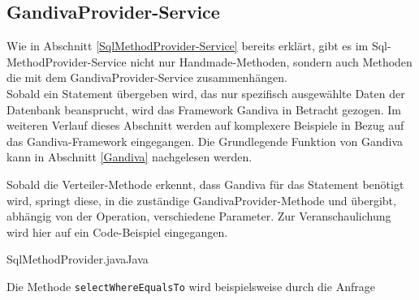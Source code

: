 \subsection{GandivaProvider-Service}
\label{GandivaProvider-Service}

Wie in Abschnitt \ref{SqlMethodProvider-Service} bereits erklärt, gibt es im Sql-MethodProvider-Service nicht nur Handmade-Methoden, sondern auch Methoden die mit dem GandivaProvider-Service zusammenhängen.
\\
Sobald ein Statement übergeben wird, das nur spezifisch ausgewählte Daten der Datenbank beansprucht, wird das Framework Gandiva in Betracht gezogen.
Im weiteren Verlauf dieses Abschnitt werden auf komplexere Beispiele in Bezug auf das Gandiva-Framework eingegangen. Die Grundlegende Funktion von Gandiva kann in Abschnitt \ref{Gandiva} nachgelesen werden.

Sobald die Verteiler-Methode erkennt, dass Gandiva für das Statement benötigt wird, springt diese, in die zuständige GandivaProvider-Methode und übergibt, abhängig von der Operation, verschiedene Parameter. Zur Veranschaulichung wird hier auf ein Code-Beispiel eingegangen.

\begin{codeblock}{SqlMethodProvider.java}{Java}
  \begin{javacode}
    private IndexResponse selectWhereEqualsTo(String columnName, int value, Table table) throws GandivaException {

        Filter filter = gandivaProvider.equalsTo_NumberFilter(table,columnName,value);

        ArrowRecordBatch batch = gandivaProvider.createBatch(table,columnName);

        SelectionVectorInt32 selectionVectorInt32 = gandivaProvider.createSelectionVector(table);

        filter.evaluate(batch,selectionVectorInt32);

        int[] indices = MemoryUtil.selectionVectorToArray(selectionVectorInt32);

...

  \end{javacode}
\end{codeblock}

Die Methode \texttt{selectWhereEqualsTo} wird beispielsweise durch die Anfrage

\begin{center}
\label{Where-Statement}
\end{center}

